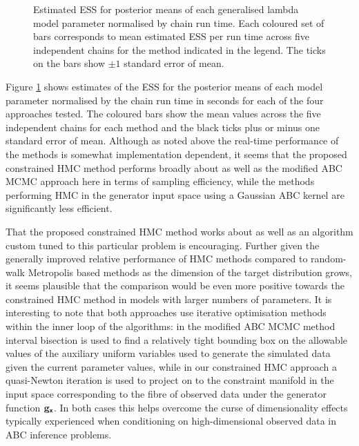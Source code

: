 \begin{figure}
\centering
{}
\caption[Generalised $\lambda$ parameter \acs{ESS} estimates.]{Estimated \ac{ESS} for posterior means of each generalised lambda model parameter normalised by chain run time. Each coloured set of bars corresponds to mean estimated \ac{ESS} per run time across five independent chains for the method indicated in the legend. The ticks on the bars show $\pm 1$ standard error of mean.}
\label{fig:generalised-lambda-param-posterior-ess-plot}
\end{figure}

Figure \ref{fig:generalised-lambda-param-posterior-ess-plot} shows estimates of the \ac{ESS} for the posterior means of each model parameter normalised by the chain run time in seconds for each of the four approaches tested. The coloured bars show the mean values across the five independent chains for each method and the black ticks plus or minus one standard error of mean. Although as noted above the real-time performance of the methods is somewhat implementation dependent, it seems that the proposed constrained \ac{HMC} method performs broadly about as well as the modified \ac{ABC} \ac{MCMC} approach here in terms of sampling efficiency, while the methods performing \ac{HMC} in the generator input space using a Gaussian \ac{ABC} kernel are significantly less efficient. 

That the proposed constrained \ac{HMC} method works about as well as an algorithm custom tuned to this particular problem is encouraging. Further given the generally improved relative performance of \ac{HMC} methods compared to random-walk Metropolis based methods as the dimension of the target distribution grows, it seems plausible that the comparison would be even more positive towards the constrained \ac{HMC} method in models with larger numbers of parameters. It is interesting to note that both approaches use iterative optimisation methods within the inner loop of the algorithms: in the modified \ac{ABC} \ac{MCMC} method interval bisection is used to find a relatively tight bounding box on the allowable values of the auxiliary uniform variables used to generate the simulated data given the current parameter values, while in our constrained \ac{HMC} approach a quasi-Newton iteration is used to project on to the constraint manifold in the input space corresponding to the fibre of observed data under the generator function ${\mathbf{g}}_{\boldsymbol{\mathsf{x}}}$. In both cases this helps overcome the curse of dimensionality effects typically experienced when conditioning on high-dimensional observed data in \ac{ABC} inference problems.

